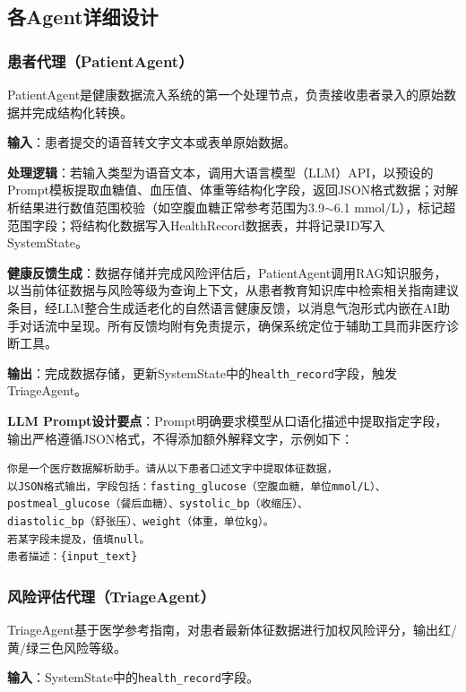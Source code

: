 \subsection{各Agent详细设计}

\subsubsection{患者代理（PatientAgent）}

PatientAgent是健康数据流入系统的第一个处理节点，负责接收患者录入的原始数据并完成结构化转换。

\textbf{输入}：患者提交的语音转文字文本或表单原始数据。

\textbf{处理逻辑}：若输入类型为语音文本，调用大语言模型（LLM）API，以预设的Prompt模板提取血糖值、血压值、体重等结构化字段，返回JSON格式数据；对解析结果进行数值范围校验（如空腹血糖正常参考范围为3.9$\sim$6.1 mmol/L），标记超范围字段；将结构化数据写入HealthRecord数据表，并将记录ID写入SystemState。

\textbf{健康反馈生成}：数据存储并完成风险评估后，PatientAgent调用RAG知识服务，以当前体征数据与风险等级为查询上下文，从患者教育知识库中检索相关指南建议条目，经LLM整合生成适老化的自然语言健康反馈，以消息气泡形式内嵌在AI助手对话流中呈现。所有反馈均附有免责提示，确保系统定位于辅助工具而非医疗诊断工具。

\textbf{输出}：完成数据存储，更新SystemState中的\texttt{health\_record}字段，触发TriageAgent。

\textbf{LLM Prompt设计要点}：Prompt明确要求模型从口语化描述中提取指定字段，输出严格遵循JSON格式，不得添加额外解释文字，示例如下：

\begin{lstlisting}[language={}, caption={PatientAgent LLM Prompt模板}]
你是一个医疗数据解析助手。请从以下患者口述文字中提取体征数据，
以JSON格式输出，字段包括：fasting_glucose（空腹血糖，单位mmol/L）、
postmeal_glucose（餐后血糖）、systolic_bp（收缩压）、
diastolic_bp（舒张压）、weight（体重，单位kg）。
若某字段未提及，值填null。
患者描述：{input_text}
\end{lstlisting}


\subsubsection{风险评估代理（TriageAgent）}

TriageAgent基于医学参考指南，对患者最新体征数据进行加权风险评分，输出红/黄/绿三色风险等级。

\textbf{输入}：SystemState中的\texttt{health\_record}字段。


